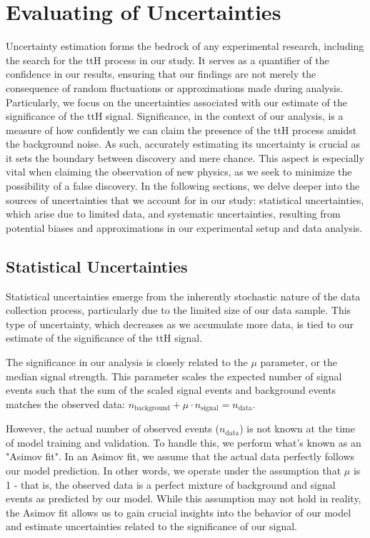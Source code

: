 \chapter{Evaluating of Uncertainties}
\label{ch:Evaluation}

Uncertainty estimation forms the bedrock of any experimental research, including the search for the ttH process in our
study. It serves as a quantifier of the confidence in our results, ensuring that our findings are not merely the
consequence of random fluctuations or approximations made during analysis. Particularly, we focus on the uncertainties
associated with our estimate of the significance of the ttH signal. Significance, in the context of our analysis, is a
measure of how confidently we can claim the presence of the ttH process amidst the background noise. As such, accurately
estimating its uncertainty is crucial as it sets the boundary between discovery and mere chance. This aspect is
especially vital when claiming the observation of new physics, as we seek to minimize the possibility of a false
discovery. In the following sections, we delve deeper into the sources of uncertainties that we account for in our
study: statistical uncertainties, which arise due to limited data, and systematic uncertainties, resulting from
potential biases and approximations in our experimental setup and data analysis.

\section{Statistical Uncertainties}

Statistical uncertainties emerge from the inherently stochastic nature of the data collection process, particularly due
to the limited size of our data sample. This type of uncertainty, which decreases as we accumulate more data, is tied to
our estimate of the significance of the ttH signal.

The significance in our analysis is closely related to the $\mu$ parameter, or the median signal strength. This
parameter scales the expected number of signal events such that the sum of the scaled signal events and background
events matches the observed data: $n_{\text{background}} + \mu \cdot n_{\text{signal}} = n_{\text{data}}$.

However, the actual number of observed events ($n_{\text{data}}$) is not known at the time of model training and
validation. To handle this, we perform what's known as an "Asimov fit". In an Asimov fit, we assume that the actual data
perfectly follows our model prediction. In other words, we operate under the assumption that $\mu$ is 1 - that is, the
observed data is a perfect mixture of background and signal events as predicted by our model. While this assumption may
not hold in reality, the Asimov fit allows us to gain crucial insights into the behavior of our model and estimate
uncertainties related to the significance of our signal.

